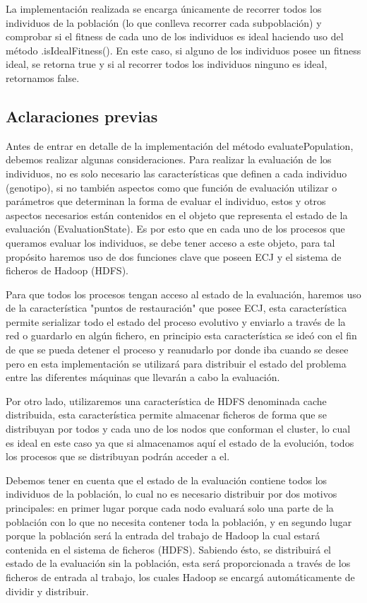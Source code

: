 La implementación realizada se encarga únicamente de recorrer todos los individuos de la población (lo que conlleva recorrer cada subpoblaci\'on) y comprobar si el fitness de cada uno de los individuos es ideal haciendo uso del método .isIdealFitness(). En este caso, si alguno de los individuos posee un fitness ideal, se retorna true y si al recorrer todos los individuos ninguno es ideal, retornamos false.

\subsection{Aclaraciones previas}

Antes de entrar en detalle de la implementación del método evaluatePopulation, debemos realizar algunas consideraciones. Para realizar la evaluación de los individuos, no es solo necesario las características que definen a cada individuo (genotipo), si no también aspectos como que función de evaluación utilizar o parámetros que determinan la forma de evaluar el individuo, estos y otros aspectos necesarios est\'an contenidos en el objeto que representa el estado de la evaluación (EvaluationState). Es por esto que en cada uno de los procesos que queramos evaluar los individuos, se debe tener acceso a este objeto, para tal propósito haremos uso de dos funciones clave que poseen ECJ y el sistema de ficheros de Hadoop (HDFS).

Para que todos los procesos tengan acceso al estado de la evaluación, haremos uso de la característica "puntos de restauración" que posee ECJ, esta característica permite serializar todo el estado del proceso evolutivo y enviarlo a través de la red o guardarlo en algún fichero, en principio esta característica se ide\'o con el fin de que se pueda detener el proceso y reanudarlo por donde iba cuando se desee pero en esta implementación se utilizar\'a para distribuir el estado del problema entre las diferentes m\'aquinas que llevar\'an a cabo la evaluación.

Por otro lado, utilizaremos una característica de HDFS denominada cache distribuida, esta característica permite almacenar ficheros de forma que se distribuyan por todos y cada uno de los nodos que conforman el cluster, lo cual es ideal en este caso ya que si almacenamos aquí el estado de la evolución, todos los procesos que se distribuyan podrán acceder a el.

Debemos tener en cuenta que el estado de la evaluación contiene todos los individuos de la población, lo cual no es necesario distribuir por dos motivos principales: en primer lugar porque cada nodo evaluar\'a solo una parte de la población con lo que no necesita contener toda la población, y en segundo lugar porque la población ser\'a la entrada del trabajo de Hadoop la cual estará contenida en el sistema de ficheros (HDFS). Sabiendo \'esto, se distribuirá el estado de la evaluación sin la población, esta ser\'a proporcionada a través de los ficheros de entrada al trabajo, los cuales Hadoop se encarg\'a automáticamente de dividir y distribuir.

